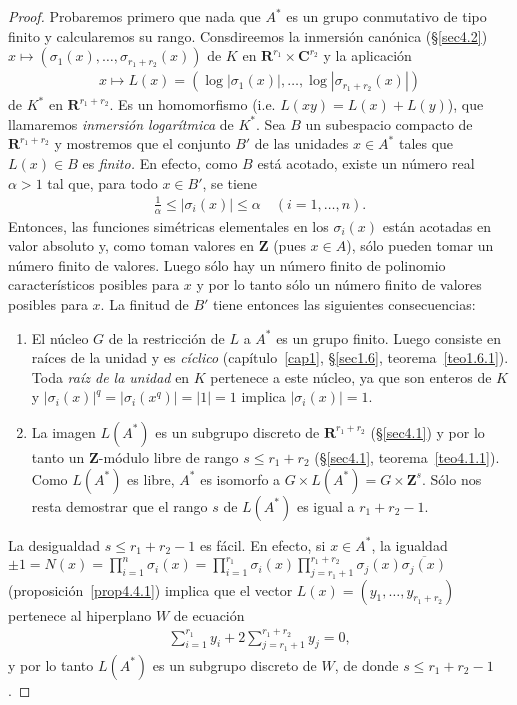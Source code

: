\documentclass[10pt,oneside,bibtotoc,smallheadings,leqno,a5paper,DIV=12]{scrbook}
\newcommand{\RR}{\mathbf{R}}
\newcommand{\ZZ}{\mathbf{Z}}
\newcommand{\CC}{\mathbf{C}}
\newcommand{\oline}[1]{\overline{#1}}
\newcommand{\abs}[1]{\left\lvert#1\right\rvert}
\numberwithin{equation}{section}
\theoremstyle{defi}
\theoremstyle{enonce}
\theoremstyle{rem}
\numberwithin{theorem}{section}
\numberwithin{proposition}{section}
\numberwithin{definition}{section}
\numberwithin{lemma}{section}
\numberwithin{corollary}{section}
\numberwithin{example}{section}
\numberwithin{footnote}{section}%
\begin{document}
\begin{proof}
Probaremos primero que nada que $A^{*}$ es un grupo conmutativo de tipo finito y calcularemos su rango.
Consdireemos la inmersi\'on can\'onica (\S\ref{sec4.2}) $x\mapsto(\sigma_{1}(x),\dots,\sigma_{r_{1}+r_{2}}(x))$
de $K$ en $\RR^{r_{1}}\times\CC^{r_{2}}$ y la aplicaci\'on
\begin{gather}
x\mapsto L(x) = (\log\abs{\sigma_{1}(x)},\dots,\log\abs{\sigma_{r_{1}+r_{2}}(x)})
\end{gather}
de $K^{*}$ en $\RR^{r_{1}+r_{2}}$. Es un homomorfismo (i.e. $L(xy) = L(x)+L(y)$), que llamaremos
{\em inmersi\'on logar\'itmica} de $K^{*}$. Sea $B$ un subespacio compacto de $\RR^{r_{1}+r_{2}}$ y
mostremos que el conjunto $B'$ de las unidades $x\in A^{*}$ tales que $L(x)\in B$ es {\em finito.} En
efecto, como $B$ est\'a acotado, existe un n\'umero real $\alpha > 1$ tal que, para todo $x\in B'$, se tiene
\begin{gather*}
\frac{1}{\alpha}\leq\abs{\sigma_{i}(x)}\leq\alpha\quad(i=1,\dots,n).
\end{gather*}
Entonces, las funciones sim\'etricas elementales en los $\sigma_{i}(x)$ est\'an acotadas en valor absoluto
y, como toman valores en $\ZZ$ (pues $x\in A$), s\'olo pueden tomar un n\'umero finito de valores. Luego
s\'olo hay un n\'umero finito de polinomio caracter\'isticos posibles para $x$ y por lo tanto s\'olo un n\'umero
finito de valores posibles para $x$. La finitud de $B'$ tiene entonces las siguientes consecuencias:
\begin{enumerate}
\item El n\'ucleo $G$ de la restricci\'on de $L$ a $A^{*}$ es un grupo finito. Luego consiste en ra\'ices de
la unidad y es {\em c\'iclico} (cap\'itulo~\ref{cap1}, \S\ref{sec1.6}, teorema~\ref{teo1.6.1}). Toda {\em ra\'iz de la unidad} en $K$ pertenece
a este n\'ucleo, ya que son enteros de $K$ y $\abs{\sigma_{i}(x)}^{q}=\abs{\sigma_{i}(x^{q})}=\abs{1}=1$
implica $\abs{\sigma_{i}(x)}=1$.
\item La imagen $L(A^{*})$ es un subgrupo discreto de $\RR^{r_{1}+r_{2}}$ (\S\ref{sec4.1}) y por lo tanto un
$\ZZ$-m\'odulo libre de rango $s\leq r_{1}+r_{2}$ (\S\ref{sec4.1}, teorema~\ref{teo4.1.1}). Como $L(A^{*})$ es libre, $A^{*}$
es isomorfo a $G\times L(A^{*}) = G\times\ZZ^{s}$. S\'olo nos resta demostrar que el rango $s$ de $L(A^{*})$
es igual a $r_{1}+r_{2}-1$.
\end{enumerate}
La desigualdad $s\leq r_{1}+r_{2}-1$ es f\'acil. En efecto, si $x\in A^{*}$, la igualdad
$\pm 1=N(x) = \prod_{i=1}^{n}\sigma_{i}(x) = \prod_{i=1}^{r_{1}}\sigma_{i}(x)\prod_{j=r_{1}+1}^{r_{1}+r_{2}}
\sigma_{j}(x)\oline{\sigma_{j}(x)}$ (proposici\'on~\ref{prop4.4.1})
implica que el vector $L(x) = (y_{1},\dots,y_{r_{1}+r_{2}})$
pertenece al hiperplano $W$ de ecuaci\'on
\begin{gather}\label{eq-4.4-2}
\sum_{i=1}^{r_{1}}y_{i}+2\sum_{j=r_{1}+1}^{r_{1}+r_{2}}y_{j} = 0,
\end{gather}
y por lo tanto $L(A^{*})$ es un subgrupo discreto de $W$, de donde $s\leq r_{1}+r_{2}-1$.


\end{proof}
\end{document}
